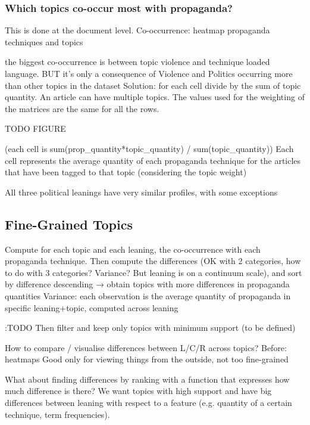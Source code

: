 \subsubsection{Which topics co-occur most with propaganda?}
This is done at the document level.
Co-occurrence: heatmap propaganda techniques and topics

the biggest co-occurrence is between topic violence and technique loaded language.
BUT it’s only a consequence of Violence and Politics occurring more than other topics in the dataset
Solution: for each cell divide by the sum of topic quantity. An article can have multiple topics. The values used for the weighting of the matrices are the same for all the rows.

TODO FIGURE

(each cell is sum(prop\_quantity*topic\_quantity) / sum(topic\_quantity))
Each cell represents the average quantity of each propaganda technique for the articles that have been tagged to that topic (considering the topic weight)


All three political leanings have very similar profiles, with some exceptions





\subsection{Fine-Grained Topics}

Compute for each topic and each leaning, the co-occurrence with each propaganda technique. Then compute the differences (OK with 2 categories, how to do with 3 categories? Variance? But leaning is on a continuum scale), and sort by difference descending → obtain topics with more differences in propaganda quantities
Variance: each observation is the average quantity of propaganda in specific leaning+topic, computed across leaning


:TODO
Then filter and keep only topics with minimum support (to be defined)

How to compare / visualise differences between L/C/R across topics?
Before: heatmaps
Good only for viewing things from the outside, not too fine-grained

What about finding differences by ranking with a function that expresses how much difference is there?
We want topics with high support and have big differences between leaning with respect to a feature (e.g. quantity of a certain technique, term frequencies).

